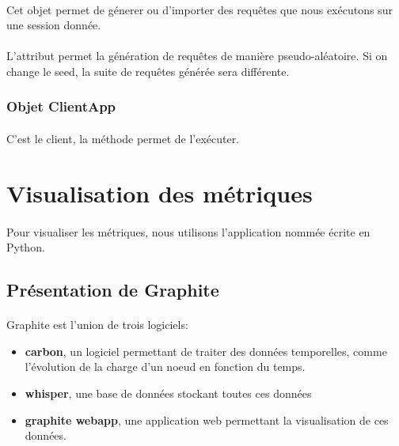 \documentclass[12pt]{article}
\begin{document}
\paragraph{} Cet objet permet de génerer ou d'importer des requêtes  que nous exécutons sur une session donnée.

\paragraph{} L'attribut  permet la génération de requêtes de manière pseudo-aléatoire. 
Si on change le seed, la suite de requêtes générée sera différente.

\subsubsection{ Objet ClientApp }

\paragraph{} C'est le client, la méthode  permet de l'exécuter.



\newpage


\section{Visualisation des métriques}

\paragraph{} Pour visualiser les métriques, nous utilisons l'application nommée  écrite en Python.

\subsection{Présentation de Graphite}

\paragraph{} Graphite est l'union de trois logiciels:
\begin{itemize}
 \item \textbf{carbon}, un logiciel permettant de traiter des données temporelles, comme l'évolution de la charge d'un noeud en fonction du temps.
 \item \textbf{whisper}, une base de données stockant toutes ces données
 \item \textbf{graphite webapp}, une application web permettant la visualisation de ces données.
\end{itemize}
\end{document}
